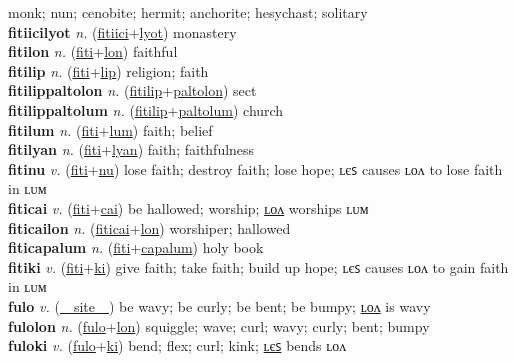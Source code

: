 monk; nun; cenobite; hermit; anchorite; hesychast; solitary \label{fitiicilon} \\
\textbf{fitiicilyot} \textit{n.} (\hyperref[fitiici]{fitiici}+\hyperref[lyot]{lyot})
monastery \label{fitiicilyot} \\
\textbf{fitilon} \textit{n.} (\hyperref[fiti]{fiti}+\hyperref[lon]{lon})
faithful \label{fitilon} \\
\textbf{fitilip} \textit{n.} (\hyperref[fiti]{fiti}+\hyperref[lip]{lip})
religion; faith \label{fitilip} \\
\textbf{fitilippaltolon} \textit{n.} (\hyperref[fitilip]{fitilip}+\hyperref[paltolon]{paltolon})
sect \label{fitilippaltolon} \\
\textbf{fitilippaltolum} \textit{n.} (\hyperref[fitilip]{fitilip}+\hyperref[paltolum]{paltolum})
church \label{fitilippaltolum} \\
\textbf{fitilum} \textit{n.} (\hyperref[fiti]{fiti}+\hyperref[lum]{lum})
faith; belief \label{fitilum} \\
\textbf{fitilyan} \textit{n.} (\hyperref[fiti]{fiti}+\hyperref[lyan]{lyan})
faith; faithfulness \label{fitilyan} \\
\textbf{fitinu} \textit{v.} (\hyperref[fiti]{fiti}+\hyperref[nu]{nu})
lose faith; destroy faith; lose hope; ʟєꜱ causes ʟᴏᴧ to lose faith in ʟᴜᴍ \label{fitinu} \\
\textbf{fiticai} \textit{v.} (\hyperref[fiti]{fiti}+\hyperref[cai]{cai})
be hallowed; worship; \hyperref[fiticailon]{ʟᴏᴧ} worships ʟᴜᴍ \label{fiticai} \\
\textbf{fiticailon} \textit{n.} (\hyperref[fiticai]{fiticai}+\hyperref[lon]{lon})
worshiper; hallowed \label{fiticailon} \\
\textbf{fiticapalum} \textit{n.} (\hyperref[fiti]{fiti}+\hyperref[capalum]{capalum})
holy book \label{fiticapalum} \\
\textbf{fitiki} \textit{v.} (\hyperref[fiti]{fiti}+\hyperref[ki]{ki})
give faith; take faith; build up hope; ʟєꜱ causes ʟᴏᴧ to gain faith in ʟᴜᴍ \label{fitiki} \\
\textbf{fulo} \textit{v.} (\hyperref[site]{~~site~~})
be wavy; be curly; be bent; be bumpy; \hyperref[fulolon]{ʟᴏᴧ} is wavy \label{fulo} \\
\textbf{fulolon} \textit{n.} (\hyperref[fulo]{fulo}+\hyperref[lon]{lon})
squiggle; wave; curl; wavy; curly; bent; bumpy \label{fulolon} \\
\textbf{fuloki} \textit{v.} (\hyperref[fulo]{fulo}+\hyperref[ki]{ki})
bend; flex; curl; kink; \hyperref[fulokiles]{ʟєꜱ} bends ʟᴏᴧ \label{fuloki} \\
